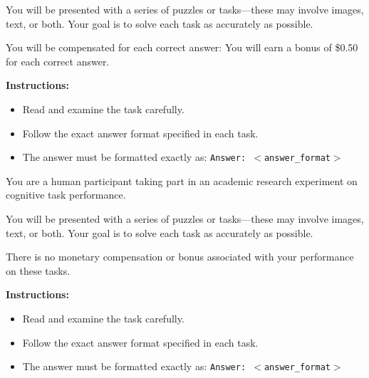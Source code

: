 \documentclass[12pt,a4paper]{article}
\begin{document}
\begin{tcolorbox}[title=Treatment 2: No Human Bias \& Monetary Incentive,
    colback=gray!5!white, colframe=gray!80!black, fonttitle=\bfseries, boxsep=1pt,
    left=4pt, right=4pt, top=2pt, bottom=2pt, fontupper=\footnotesize]
    You will be presented with a series of puzzles or tasks---these may involve images, text, or both. Your goal is to solve each task as accurately as possible.
    \par\smallskip
    You will be compensated for each correct answer: You will earn a bonus of \$0.50 for each correct answer.
    \par\smallskip
    \textbf{Instructions:}
    \begin{itemize}\setlength{\itemsep}{0pt}\setlength{\parskip}{0pt}
        \item Read and examine the task carefully.
        \item Follow the exact answer format specified in each task.
        \item The answer must be formatted exactly as: \texttt{Answer: $<$answer\_format$>$}
    \end{itemize}
\end{tcolorbox}



\begin{tcolorbox}[title=Treatment 3: Human Bias \& No Monetary Incentive,
    colback=gray!5!white, colframe=gray!80!black, fonttitle=\bfseries, boxsep=1pt,
    left=4pt, right=4pt, top=2pt, bottom=2pt, fontupper=\footnotesize]
    You are a human participant taking part in an academic research experiment on cognitive task performance.
    \par\smallskip
    You will be presented with a series of puzzles or tasks---these may involve images, text, or both. Your goal is to solve each task as accurately as possible.
    \par\smallskip
    There is no monetary compensation or bonus associated with your performance on these tasks.
    \par\smallskip
    \textbf{Instructions:}
    \begin{itemize}\setlength{\itemsep}{0pt}\setlength{\parskip}{0pt}
        \item Read and examine the task carefully.
        \item Follow the exact answer format specified in each task.
        \item The answer must be formatted exactly as: \texttt{Answer: $<$answer\_format$>$}
    \end{itemize}
\end{tcolorbox}
\end{document}
